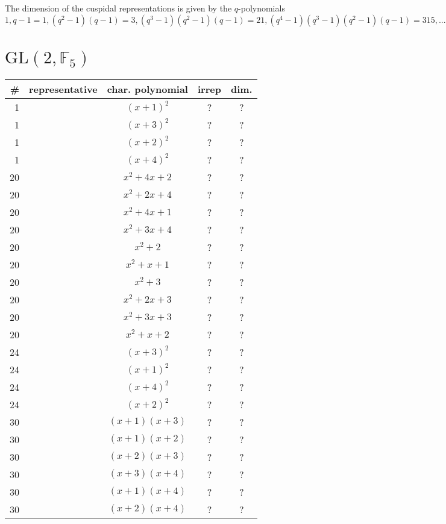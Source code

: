 \documentclass[11pt,oneside]{article}
\newcommand{\GL}{\mathrm{GL}}
\newcommand{\Field}{\mathbb{F}}
\begin{document}
The dimension of the cuspidal representations is given by the $q$-polynomials
$
1, q-1=1, 
(q^2-1)(q-1)=3, 
(q^3-1)(q^2-1)(q-1)=21, 
(q^4-1)(q^3-1)(q^2-1)(q-1)=315, ...
$


\section{$\GL(2,\Field_5)$}

\begin{center}
\begin{tabular}{r|l|c|c|c}
\# & representative & char. polynomial & irrep & dim. \\
\hline
1  &   & $(x+1)^2$  & ? & ?  \\
1  &   & $(x+3)^2$  & ? & ?  \\
1  &   & $(x+2)^2$  & ? & ?  \\
1  &   & $(x+4)^2$  & ? & ?  \\
20  &   & $x^2+4x+2$  & ? & ?  \\
20  &   & $x^2+2x+4$  & ? & ?  \\
20  &   & $x^2+4x+1$  & ? & ?  \\
20  &   & $x^2+3x+4$  & ? & ?  \\
20  &   & $x^2+2$  & ? & ?  \\
20  &   & $x^2+x+1$  & ? & ?  \\
20  &   & $x^2+3$  & ? & ?  \\
20  &   & $x^2+2x+3$  & ? & ?  \\
20  &   & $x^2+3x+3$  & ? & ?  \\
20  &   & $x^2+x+2$  & ? & ?  \\
24  &   & $(x+3)^2$  & ? & ?  \\
24  &   & $(x+1)^2$  & ? & ?  \\
24  &   & $(x+4)^2$  & ? & ?  \\
24  &   & $(x+2)^2$  & ? & ?  \\
30  &   & $(x+1)(x+3)$  & ? & ?  \\
30  &   & $(x+1)(x+2)$  & ? & ?  \\
30  &   & $(x+2)(x+3)$  & ? & ?  \\
30  &   & $(x+3)(x+4)$  & ? & ?  \\
30  &   & $(x+1)(x+4)$  & ? & ?  \\
30  &   & $(x+2)(x+4)$  & ? & ?  \\
\end{tabular}
\end{center}
\end{document}
